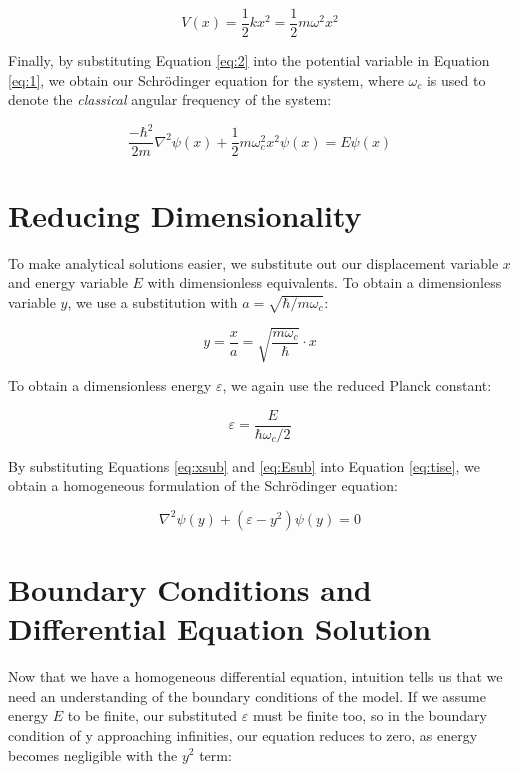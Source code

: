 \documentclass[a4paper]{article}
\begin{document}
\begin{equation} \label{eq:2}
V(x)=\frac12kx^2=\frac12m\omega^2x^2
\end{equation}

Finally, by substituting Equation \ref{eq:2} into the potential variable in Equation \ref{eq:1}, we obtain our Schr\"odinger equation for the system, where $\omega_c$ is used to denote the {\it classical} angular frequency of the system:

\begin{equation} \label{eq:tise}
\frac{-\hbar^2}{2m}\nabla^2\psi(x) + \frac12m\omega^2_cx^2\psi(x)=E\psi(x)
\end{equation} 

\section{Reducing Dimensionality}

To make analytical solutions easier, we substitute out our displacement variable $x$ and energy variable $E$ with dimensionless equivalents. To obtain a dimensionless variable $y$, we use a substitution with $a=\sqrt{\hbar/m\omega_c}$:

\begin{equation} \label{eq:xsub}
y=\frac xa=\sqrt{\frac{m\omega_c}\hbar}\cdot x
\end{equation}

To obtain a dimensionless energy $\varepsilon$, we again use the reduced Planck constant:

\begin{equation} \label{eq:Esub}
\varepsilon=\frac E{\hbar\omega_c/2}
\end{equation}

By substituting Equations \ref{eq:xsub} and \ref{eq:Esub} into Equation \ref{eq:tise}, we obtain a homogeneous formulation of the Schr\"odinger equation:

\begin{equation} \label{eq:tise_hom}
\nabla^2\psi(y)+(\varepsilon-y^2)\psi(y)=0
\end{equation} 

\section{Boundary Conditions and Differential Equation Solution}

Now that we have a homogeneous differential equation, intuition tells us that we need an understanding of the boundary conditions of the model. If we assume energy $E$ to be finite, our substituted $\varepsilon$ must be finite too, so in the boundary condition of y approaching infinities, our equation reduces to zero, as energy becomes negligible with the $y^2$ term:
\end{document}
